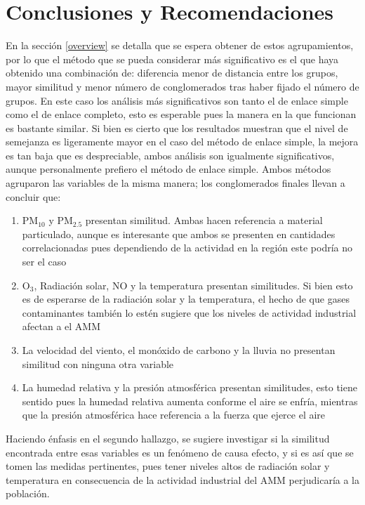 \documentclass[journal, 10pt]{IEEEtran}                                                          %
\begin{document}
\section{Conclusiones y Recomendaciones} \label{conclusiones}

En la sección \ref{overview} se detalla que se espera obtener de estos agrupamientos, por lo que el método que se pueda considerar más significativo es el que haya obtenido una combinación de: diferencia menor de distancia entre los grupos, mayor similitud y menor número de conglomerados tras haber fijado el número de grupos. En este caso los análisis más significativos son tanto el de enlace simple como el de enlace completo, esto es esperable pues la manera en la que funcionan es bastante similar. Si bien es cierto que los resultados muestran que el nivel de semejanza es ligeramente mayor en el caso del método de enlace simple, la mejora es tan baja que es despreciable, ambos análisis son igualmente significativos, aunque personalmente prefiero el método de enlace simple. Ambos métodos agruparon las variables de la misma manera; los conglomerados finales llevan a concluir que:
\begin{enumerate}
    \item PM$_{10}$ y PM$_{2.5}$ presentan similitud. Ambas hacen referencia a material particulado, aunque es interesante que ambos se presenten en cantidades correlacionadas pues dependiendo de la actividad en la región este podría no ser el caso 
    \item O$_3$, Radiación solar, NO y la temperatura presentan similitudes. Si bien esto es de esperarse de la radiación solar y la temperatura, el hecho de que gases contaminantes también lo estén sugiere que los niveles de actividad industrial afectan a el AMM
    \item La velocidad del viento, el monóxido de carbono y la lluvia no presentan similitud con ninguna otra variable
    \item La humedad relativa y la presión atmosférica presentan similitudes, esto tiene sentido pues la humedad relativa aumenta conforme el aire se enfría, mientras que la presión atmosférica hace referencia a la fuerza que ejerce el aire
\end{enumerate}

Haciendo énfasis en el segundo hallazgo, se sugiere investigar si la similitud encontrada entre esas variables es un fenómeno de causa efecto, y si es así que se tomen las medidas pertinentes, pues tener niveles altos de radiación solar y temperatura en consecuencia de la actividad industrial del AMM perjudicaría a la población. 
\end{document}
